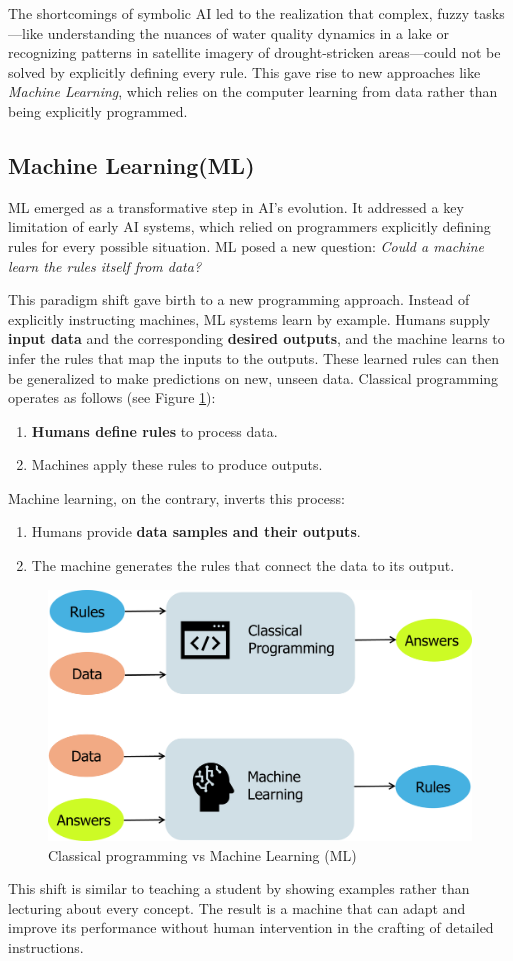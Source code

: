 The shortcomings of symbolic AI led to the realization that complex, fuzzy tasks—like understanding the nuances of water quality dynamics in a lake or recognizing patterns in satellite imagery of drought-stricken areas—could not be solved by explicitly defining every rule. This gave rise to new approaches like \textit{Machine Learning}, which relies on the computer learning from data rather than being explicitly programmed.

\subsection{Machine Learning(ML)}

ML emerged as a transformative step in AI's evolution. It addressed a key limitation of early AI systems, which relied on programmers explicitly defining rules for every possible situation. ML posed a new question: \textit{Could a machine learn the rules itself from data?}

This paradigm shift gave birth to a new programming approach. Instead of explicitly instructing machines, ML systems learn by example. Humans supply \textbf{input data} and the corresponding \textbf{desired outputs}, and the machine learns to infer the rules that map the inputs to the outputs. These learned rules can then be generalized to make predictions on new, unseen data. Classical programming operates as follows (see Figure \ref{fig:ml}):
\begin{enumerate}
    \item \textbf{Humans define rules} to process data.
    \item Machines apply these rules to produce outputs.
\end{enumerate}

Machine learning, on the contrary, inverts this process:
\begin{enumerate}
    \item Humans provide \textbf{ data samples and their outputs}.
    \item The machine generates the rules that connect the data to its output.
\end{enumerate}
\begin{figure}
    
    \includegraphics[width=0.75
    \linewidth]{images/ml.png}
    \caption{Classical programming vs Machine Learning (ML)}
    \label{fig:ml}
\end{figure}
This shift is similar to teaching a student by showing examples rather than lecturing about every concept. The result is a machine that can adapt and improve its performance without human intervention in the crafting of detailed instructions.

